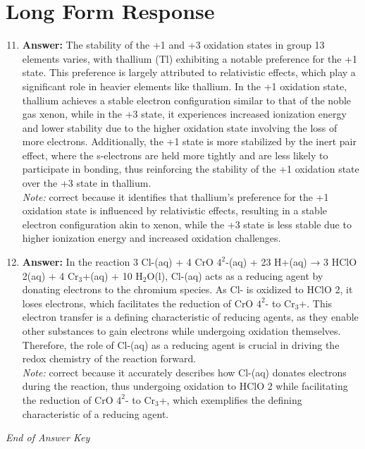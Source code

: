 \documentclass[12pt]{article}
\begin{document}
\section*{Long Form Response}
\begin{enumerate}[label=\arabic*.]
\setcounter{enumi}{10}
\item \textbf{Answer:} The stability of the +1 and +3 oxidation states in group 13 elements varies, with thallium (Tl) exhibiting a notable preference for the +1 state. This preference is largely attributed to relativistic effects, which play a significant role in heavier elements like thallium. In the +1 oxidation state, thallium achieves a stable electron configuration similar to that of the noble gas xenon, while in the +3 state, it experiences increased ionization energy and lower stability due to the higher oxidation state involving the loss of more electrons. Additionally, the +1 state is more stabilized by the inert pair effect, where the s-electrons are held more tightly and are less likely to participate in bonding, thus reinforcing the stability of the +1 oxidation state over the +3 state in thallium.
\\ \textit{Note:} correct because it identifies that thallium's preference for the +1 oxidation state is influenced by relativistic effects, resulting in a stable electron configuration akin to xenon, while the +3 state is less stable due to higher ionization energy and increased oxidation challenges.
\item \textbf{Answer:} In the reaction 3 Cl-(aq) + 4 CrO $4^2$-(aq) + 23 H+(aq) → 3 HClO 2(aq) + 4 Cr$_{3}$+(aq) + 10 H$_{2}$O(l), Cl-(aq) acts as a reducing agent by donating electrons to the chromium species. As Cl- is oxidized to HClO 2, it loses electrons, which facilitates the reduction of CrO $4^2$- to Cr$_{3}$+. This electron transfer is a defining characteristic of reducing agents, as they enable other substances to gain electrons while undergoing oxidation themselves. Therefore, the role of Cl-(aq) as a reducing agent is crucial in driving the redox chemistry of the reaction forward.
\\ \textit{Note:} correct because it accurately describes how Cl-(aq) donates electrons during the reaction, thus undergoing oxidation to HClO 2 while facilitating the reduction of CrO $4^2$- to Cr$_{3}$+, which exemplifies the defining characteristic of a reducing agent.
\end{enumerate}

\vfill
\noindent\textit{End of Answer Key}
\end{document}
